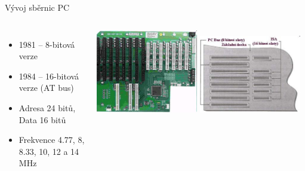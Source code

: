 \documentclass[aspectratio=43]{beamer}
\begin{document}
\begin{frame}{Vývoj sběrnic PC}
\begin{columns}
\begin{itemize}
			\item 1981 – 8-bitová verze
			\item 1984 – 16-bitová verze (AT bus)
			\item Adresa 24 bitů, Data 16 bitů
			\item Frekvence 4.77, 8, 8.33, 10, 12 a 14 MHz
		\end{itemize}
        \begin{minipage}{\textwidth}
            \includegraphics[width=0.48\textwidth]{extrahovane_obrazky/img_1_page6_15.jpeg}
            \hfill
            \includegraphics[width=0.48\textwidth]{extrahovane_obrazky/img_1_page6_16.jpeg}
        \end{minipage}
	\end{columns}
	
\end{frame}
\end{document}
